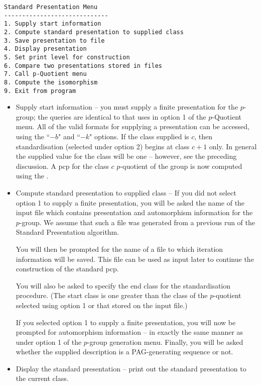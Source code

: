 \begin{verbatim}
Standard Presentation Menu
-----------------------------
1. Supply start information
2. Compute standard presentation to supplied class
3. Save presentation to file
4. Display presentation
5. Set print level for construction
6. Compare two presentations stored in files
7. Call p-Quotient menu
8. Compute the isomorphism
9. Exit from program
\end{verbatim}

\begin{itemize}
\item Supply start information -- you must supply a finite presentation
for the $p$-group; the queries are identical to that uses in
option 1 of the $p$-Quotient menu. All of the valid formats for
supplying a presentation can be accessed, 
using the ``$-b$" and ``$-k$" options. 
If the class supplied is $c$, then standardisation 
(selected under option 2) begins at class $c + 1$ only. 
In general the supplied value for the class will be one -- 
however, see the preceding discussion. 
A pcp for the class $c$ $p$-quotient of the group
is now computed using the \pq. 

\item Compute standard presentation to supplied class -- 
If you did not select option 1 to supply a finite presentation, 
you will be asked the name of the input file which contains 
presentation and automorphism information for the $p$-group. 
We assume that such a file was generated from a previous 
run of the Standard Presentation algorithm. 

You will then be prompted for the name of a file to which iteration
information will be saved. This file can be used as input
later to continue the construction of the standard pcp.

You will also be asked to specify the end class for the
standardisation procedure.  (The start class is one greater 
than the class of the $p$-quotient selected using option 1 
or that stored on the input file.)

If you selected option 1 to supply a finite presentation, 
you will now be prompted for automorphism information --
in exactly the same manner as under option 1 of
the $p$-group generation menu.  Finally, you will be 
asked whether the supplied description
is a PAG-generating sequence or not. 

\item Display the standard presentation -- 
print out the standard presentation to the current class.


\end{itemize}
